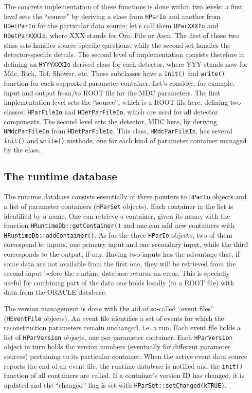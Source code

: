 The concrete implementation of these functions is done within two levels: a first 
level sets the ``source'' by deriving a class from \verb+HParIo+ and another from 
\verb+HDetParIo+ for the particular data source; let's call them \verb+HParXXXIo+ 
and \verb+HDetParXXXIo+, where XXX stands for Ora, File or Ascii. The first of 
these two class sets handles source-specific questions, while the second set 
handles the detector-specific details. The second level of implementation 
consists therefore in defining an \verb+HYYYXXXIo+ derived class for each 
detector, where YYY stands now for Mdc, Rich, Tof, Shower, etc. These subclasses 
have a \verb+init()+ and \verb+write()+ function for each supported parameter 
container. Let's consider, for example, input and output from/to ROOT file for 
the MDC parameters. The first implementation level sets the ``source'', which 
is a ROOT file here, defining two classes: \verb+HParFileIo+ and \verb+HDetParFileIo+, 
which are used for all detector components. The second level sets the detector, 
MDC here, by deriving \verb+HMdcParFileIo+ from \verb+HDetParFileIo+. This class, 
\verb+HMdcParFileIo+, has several \verb+init()+ and \verb+write()+ methods, one 
for each kind of parameter container managed by the class. 

\subsection{The runtime database}

The runtime database consists essentially of three pointers to \verb+HParIo+ 
objects and a list of parameter containers (\verb+HParSet+ objects).
Each container in the list is identified by a name. One can retrieve a container, 
given its name, with the function \verb+HRuntimeDb::getContainer()+ and one can 
add new containers with \verb+HRuntimeDb::addContainer()+.
As for the three \verb+HParIo+ objects, two of them correspond to inputs, one 
primary input and one secondary input, while the third corresponds to the output, 
if any. Having two inputs has the advantage that, if some data are not available 
from the first one, they will be retrieved from the second input before the 
runtime database returns an error. This is specially useful for combining part 
of the data one holds locally (in a ROOT file) with data from the ORACLE database.

The version management is done with the aid of so-called ``event files'' 
(\verb+HEventFile+ objects). An event file identifies a set of events for which 
the reconstruction parameters remain unchanged, i.e. a run. Each event file holds 
a list of \verb+HParVersion+ objects, one per parameter container. Each 
\verb+HParVersion+ object in turn holds the version numbers (eventually for 
different parameter sources) pertaining to its particular container. When the 
active event data source reports the end of an event file, the runtime database 
is notified and the \verb+init()+ function of all containers are called. If 
a container's version ID has changed, it is updated and the ``changed'' flag 
is set with \verb+HParSet::setChanged(kTRUE)+.

